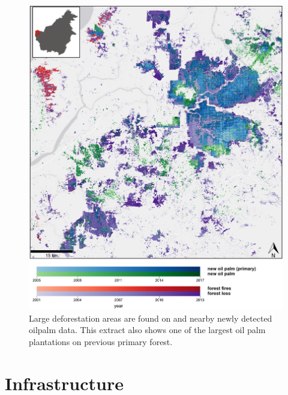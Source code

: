 \documentclass[
  letterpaper,
  DIV=11,
  numbers=noendperiod]{scrreprt}
\begin{document}
\begin{figure}

{\centering \includegraphics{text/../code/results/maps/deforestation_op_fires.png}

}

\caption{\label{fig-map_deforestation_op_fires}Large deforestation areas
are found on and nearby newly detected oilpalm data. This extract also
shows one of the largest oil palm plantations on previous primary
forest.}

\end{figure}

\hypertarget{infrastructure}{%
\section{Infrastructure}\label{infrastructure}}
\end{document}
